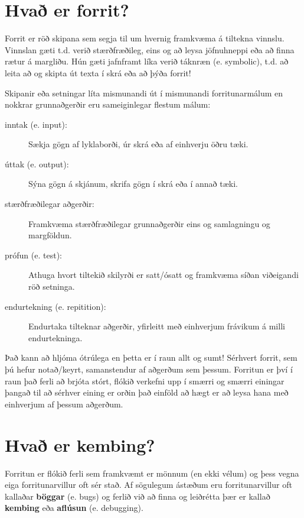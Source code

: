 \section{Hvað er forrit?}

Forrit er röð skipana sem segja til um hvernig framkvæma á tiltekna vinnslu.
Vinnslan gæti t.d. verið stærðfræðileg, eins og að leysa jöfnuhneppi eða að finna rætur á margliðu.
Hún gæti jafnframt líka verið táknræn (e. symbolic), t.d. að leita að og skipta út texta í skrá eða að þýða forrit!


Skipanir eða setningar líta mismunandi út í mismunandi forritunarmálum en nokkrar grunnaðgerðir eru sameiginlegar flestum málum:

\begin{description}

\item[inntak (e. input):] Sækja gögn af lyklaborði, úr skrá eða af einhverju öðru tæki.

\item[úttak (e. output):] Sýna gögn á skjánum, skrifa gögn í skrá eða í annað tæki. 

\item[stærðfræðilegar aðgerðir:] Framkvæma stærðfræðilegar grunnaðgerðir eins og samlagningu og margföldun.

\item[prófun (e. test):] Athuga hvort tiltekið skilyrði er satt/ósatt og framkvæma síðan viðeigandi röð setninga.

\item[endurtekning (e. repitition):] Endurtaka tilteknar aðgerðir, yfirleitt með einhverjum frávikum á milli endurtekninga.

\end{description}

Það kann að hljóma ótrúlega en þetta er í raun allt og sumt!
Sérhvert forrit, sem þú hefur notað/keyrt, samanstendur af aðgerðum sem þessum.
Forritun er því í raun það ferli að brjóta stórt, flókið verkefni upp í smærri og smærri einingar þangað til að sérhver eining er orðin það einföld að hægt er að leysa hana með einhverjum af þessum aðgerðum.

\section{Hvað er kembing?}

Forritun er flókið ferli sem framkvæmt er mönnum (en ekki vélum) og þess vegna eiga forritunarvillur oft sér stað.
Af sögulegum ástæðum eru forritunarvillur oft kallaðar {\bf böggar} (e. bugs) og ferlið við að finna og leiðrétta þær er kallað {\bf kembing} eða {\bf aflúsun} (e. debugging).

